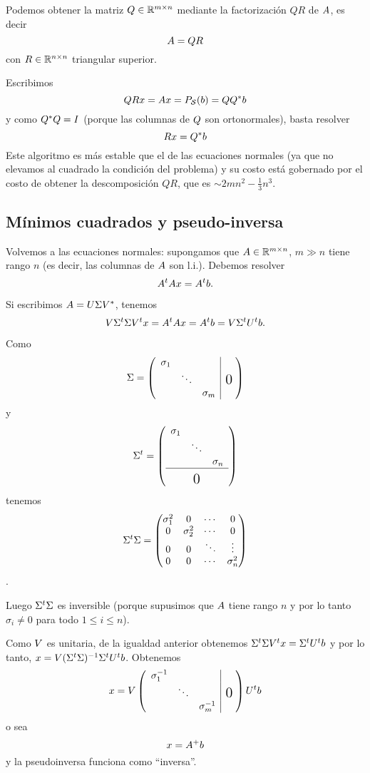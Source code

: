Podemos obtener la matriz $\Qb\in \R^{m\times n}$ mediante la factorización $QR$ de $\Ab$, es decir
$$
\Ab=\Qb\Rb
$$
con $\Rb\in \R^{n\times n}$ triangular superior.

Escribimos
$$
\Qb\Rb\xb=\Ab\xb=P_{\mathcal{S}}(\bb)=\Qb\Qb^*\bb
$$
y como $\Qb^*\Qb = \Id$ (porque las columnas de $\Qb$ son ortonormales), basta resolver
$$
\Rb\xb=\Qb^*\bb
$$
Este algoritmo es más estable que el de las ecuaciones normales (ya que no elevamos al cuadrado la condición del problema) y su costo está gobernado por el costo de obtener la descomposición $QR$, que es
$\sim 2mn^2-\frac13n^3$.

\subsection{Mínimos cuadrados y pseudo-inversa}

Volvemos a las ecuaciones normales: supongamos que $\Ab\in \R^{m\times n}$, $m \gg n$ tiene rango $n$ (es decir, las columnas de $\Ab$ son l.i.). Debemos resolver
$$
\Ab^t\Ab\xb=\Ab^t\bb.
$$

Si escribimos $\Ab=\Ub\Sigmab\Vb^*$, tenemos
$$
\Vb\Sigmab^t\Sigmab\Vb^t\xb=\Ab^t\Ab\xb=\Ab^t\bb=\Vb\Sigmab^t\Ub^t\bb.
$$

Como
$$\Sigmab= \left( \begin{array}{ccc|c@{\mskip5mu}}\sigma_1 & & \\ & \ddots & & \text{\Large 0}           \\ & & \sigma_m\end{array} \right)$$
y
$$\Sigmab^t=
\left(\begin{array}{ccc}\sigma_1 & & \\ & \ddots & \\ & &  \sigma_n\\\hline         & \rule{0cm}{15pt} \text{\Large 0} &
 \end{array}\right)
$$
tenemos
$$
\Sigmab^t\Sigmab=
\begin{pmatrix}
\sigma_1^2&0&\cdots &0\\
0&\sigma_2^2&\cdots &0\\
0&0&\ddots&\vdots\\
0&0&\cdots&\sigma_n^2
\end{pmatrix}
$$.

Luego $\Sigmab^t\Sigmab$ es inversible (porque supusimos que $\Ab$ tiene rango $n$ y por lo tanto $\sigma_i \neq 0$ para todo $1 \le i \le n$).

Como $\Vb$ es unitaria, de la igualdad anterior obtenemos $\Sigmab^t\Sigmab\Vb^t\xb=\Sigmab^t\Ub^t\bb$ y por lo tanto, $\xb = \Vb (\Sigmab^t\Sigmab)^{-1} \Sigmab^t\Ub^t\bb$.
Obtenemos
$$
\xb = \Vb \left( \begin{array}{ccc|c@{\mskip5mu}}\sigma_1^{-1} & & \\ & \ddots & & \text{\Large 0} \\ & & \sigma_m^{-1}\end{array} \right) \Ub^t\bb
$$
o sea
$$
\xb = \Ab^{+}\bb
$$
y la pseudoinversa funciona como ``inversa''.


